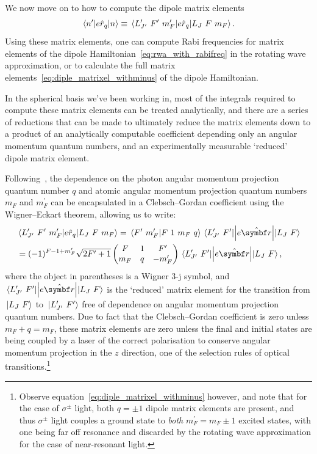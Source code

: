 We now move on to how to compute the dipole matrix elements
\begin{align}
\matrixel{n^\prime}{e\hat r_q}{n} \equiv \matrixel{L^\prime_{J^\prime}\ F^\prime\ m_F^\prime}{e\hat r_q}{L_J\ F\ m_F}.
\end{align}
Using these matrix elements, one can compute Rabi frequencies for matrix elements of the dipole Hamiltonian~\eqref{eq:rwa_with_rabifreq} in the rotating wave approximation, or to calculate the full matrix elements~\eqref{eq:diple_matrixel_withminus} of the dipole Hamiltonian.

In the spherical basis we've been working in, most of the integrals required to compute these matrix elements can be treated analytically, and there are a series of reductions that can be made to ultimately reduce the matrix elements down to a product of an analytically computable coefficient depending only an angular momentum quantum numbers, and an experimentally measurable `reduced' dipole matrix element.

Following~\cite{steck_rubidium_2015}, the dependence on the photon angular momentum projection quantum number $q$ and atomic angular momentum projection quantum numbers $m_F$ and $m_F^\prime$ can be encapsulated in a Clebsch--Gordan coefficient using the Wigner--Eckart theorem, allowing us to write:
\begin{align}
& \matrixel{L^\prime_{J^\prime}\ F^\prime\ m_F^\prime}{e\hat r_q}{L_J\ F\ m_F} = 
\braket{F^\prime\ m_F^\prime}{F\ 1\ m_F\ q}
\matrixel{L^\prime_{J^\prime}\ F^\prime}{\left|e\hat{\vec r}\right|}{L_J\ F}\\
&=
(-1)^{F - 1 + m_F^\prime}\sqrt{2F^\prime + 1}
\left(\begin{matrix}
F & 1 & F^\prime\\
m_F & q & -m_F^\prime\\
\end{matrix}\right)
\matrixel{L^\prime_{J^\prime}\ F^\prime}{\left|e\hat{\vec r}\right|}{L_J\ F},
\end{align}
where the object in parentheses is a Wigner $3$-j symbol, and $\matrixel{L^\prime_{J^\prime}\ F^\prime}{\left|e\hat{\vec r}\right|}{L_J\ F}$ is the `reduced' matrix element for the transition from $\ket{L_J\ F}$ to $\ket{L^\prime_{J^\prime}\ F^\prime}$ free of dependence on angular momentum projection quantum numbers. Due to fact that the Clebsch--Gordan coefficient is zero unless $m_F + q = m_F$, these matrix elements are zero unless the final and initial states are being coupled by a laser of the correct polarisation to conserve angular momentum projection in the $z$ direction, one of the selection rules of optical transitions.\footnote{Observe equation~\eqref{eq:diple_matrixel_withminus} however, and note that for the case of $\sigma^\pm$ light, both $q=\pm 1$ dipole matrix elements are present, and thus $\sigma^\pm$ light couples a ground state to \emph{both} $m_F^\prime = m_F \pm 1$ excited states, with one being far off resonance and discarded by the rotating wave approximation for the case of near-resonant light.}

